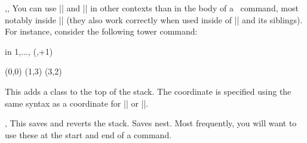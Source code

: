 \begin{sseqdata}[name = basic, cohomological Serre grading]
\begin{commandlist}{\lastx{},\lasty{},\lastclass{}}
You can use |\lastx| and |\lasty| in other contexts than in the body of a
\sseqpages\ command, most notably inside |\SseqParseInt| (they also work
correctly when used inside of |\pgfmathparse| and its siblings). For instance,
consider the following tower command:
\begin{codeexample}[width=6cm]
\DeclareSseqCommand \tower { } {
    \savestack
    \SseqParseInt{}
    \foreach \n in {1,...,\numclasses}{
        \class(\lastx,\lasty+1)
        \structline
    }
    \restorestack
}
\begin{sseqpage}[y range = {0}{5}]
\class(0,0)\tower
\class(1,3)\tower
\class(3,2)\tower
\end{sseqpage}
\end{codeexample}
\end{commandlist}


\begin{command}{\pushstack{}}%
This adds a class to the top of the stack. The coordinate is specified using the
same syntax as a coordinate for |\structline| or |\replaceclass|.
\end{command}

\begin{commandlist}{\savestack,\restorestack}%
This saves and reverts the stack. Saves nest. Most frequently, you will want to
use these at the start and end of a command.
\end{commandlist}



\end{sseqdata}
